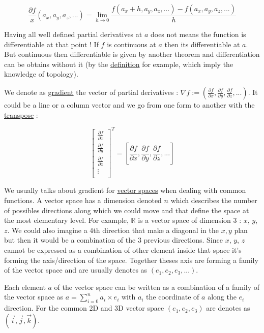 \documentclass[12pt]{article}
\begin{document}
$$
\frac{\partial{f}}{x}(a_x, a_y, a_z, ...) = \lim_{ h \to 0} \frac{f(a_x+h, a_y, a_z, ...)-f(a_x, a_y, a_z, ...)}{h}
$$

Having all well defined partial derivatives at $a$ does not means the function is differentiable at that point ! If $f$ is continuous at $a$ then its differentiable at $a$. But continuous then differentiable is given by another theorem and differentiation can be obtains without it (by the \href{https://en.wikipedia.org/wiki/Differentiable_function}{definition} for example, which imply the knowledge of topology).

We denote as \href{https://en.wikipedia.org/wiki/Gradient}{gradient} the vector of partial derivatives : $ \nabla f := (\frac{\partial{f}}{\partial{x}}, \frac{\partial{f}}{\partial{y}}, \frac{\partial{f}}{\partial{z}},...)$. It could be a line or a column vector and we go from one form to another with the \href{https://en.wikipedia.org/wiki/Transpose}{transpose} : 

$$
\begin{bmatrix}
    \frac{\partial{f}}{\partial{x}} \\
    \frac{\partial{f}}{\partial{y}} \\
    \frac{\partial{f}}{\partial{z}} \\
    \vdots \\
\end{bmatrix}^T = [\frac{\partial{f}}{\partial{x}}, \frac{\partial{f}}{\partial{y}}, \frac{\partial{f}}{\partial{z}},...]
$$

We usually talks about gradient for \href{https://en.wikipedia.org/wiki/Vector_spac}{vector spaces} when dealing with common functions. A vector space has a dimension denoted $n$ which describes the number of possibles directions along which we could move and that define the space at the most elementary level. For example, $\mathbb{R}$ is a vector space of dimension 3 : $x$, $y$, $z$. We could also imagine a 4th direction that make a diagonal in the $x,y$ plan but then it would be a combination of the 3 previous directions. Since $x$, $y$, $z$ cannot be expressed as a combination of other element inside that space it's forming the axis/direction of the space. Together theses axis are forming a family of the vector space and are usually denotes as $(e_1, e_2, e_3, ...)$. 

Each element $a$ of the vector space can be written as a combination of a family of the vector space as $a = \sum_{i=0}^{n} a_i \times e_i$ with $a_i$ the coordinate of $a$ along the $e_i$ direction. For the common 2D and 3D vector space $(e_1, e_2, e_3)$ are denotes as $(\vec{i}, \vec{j}, \vec{k})$.
\end{document}
